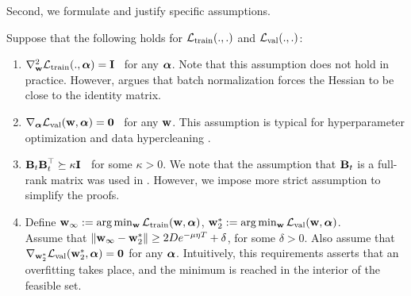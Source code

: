 Second, we formulate and justify specific assumptions.
\begin{assumption}\label{asn:spec}
Suppose that the following holds for $\mathcal{L}_{\mathrm{train}}(., .)$ and  $\mathcal{L}_{\mathrm{val}}(., .)$:
    \begin{enumerate}
        \item $\nabla^2_{\boldsymbol{\mathbf{w}}}\mathcal{L}_{\mathrm{train}}(., \boldsymbol{\mathbf{\alpha}}) = \boldsymbol{\mathbf{I}}$ \, for any $\boldsymbol{\mathbf{\alpha}}$. Note that this assumption does not hold in practice. However, \cite{luketina2016scalable} argues that batch normalization \cite{ioffe2015batch} forces the Hessian to be close to the identity matrix.
        \item $\nabla_{\boldsymbol{\mathbf{\alpha}}}\mathcal{L}_{\mathrm{val}}(\boldsymbol{\mathbf{w}}, \boldsymbol{\mathbf{\alpha}}) = \boldsymbol{\mathbf{0}}$ \, for any $\boldsymbol{\mathbf{w}}$. This assumption is typical for hyperparameter optimization and data hypercleaning \cite{franceschi2017forward}.
        \item $\boldsymbol{\mathbf{B}}_t\boldsymbol{\mathbf{B}}_t^\top \succeq \kappa \boldsymbol{\mathbf{I}}$ \, for some $\kappa > 0$. We note that the assumption that $\boldsymbol{\mathbf{B}}_t$ is a full-rank matrix was used in \cite{shaban2019truncated}. However, we impose more strict assumption to simplify the proofs.
        \item Define $\boldsymbol{\mathbf{w}}_{\infty} := \arg\min_{\boldsymbol{\mathbf{w}}}\mathcal{L}_{\mathrm{train}}(\boldsymbol{\mathbf{w}}, \boldsymbol{\mathbf{\alpha}})$, $\boldsymbol{\mathbf{w}}^*_2 := \arg\min_{\boldsymbol{\mathbf{w}}}\mathcal{L}_{\mathrm{val}}(\boldsymbol{\mathbf{w}}, \boldsymbol{\mathbf{\alpha}})$. \\ Assume that $\|\boldsymbol{\mathbf{w}}_{\infty} - \boldsymbol{\mathbf{w}}_2^*\| \geq 2De^{-\mu\eta T} + \delta$, for some $\delta > 0$. Also assume that $\nabla_{\boldsymbol{\mathbf{w}}_2^*}\mathcal{L}_{\mathrm{val}}(\boldsymbol{\mathbf{w}}_2^*, \boldsymbol{\mathbf{\alpha}}) = \boldsymbol{\mathbf{0}}$ for any $\boldsymbol{\mathbf{\alpha}}$. Intuitively, this requirements asserts that an overfitting takes place, and the minimum is reached in the interior of the feasible set.
    \end{enumerate}
\end{assumption}


